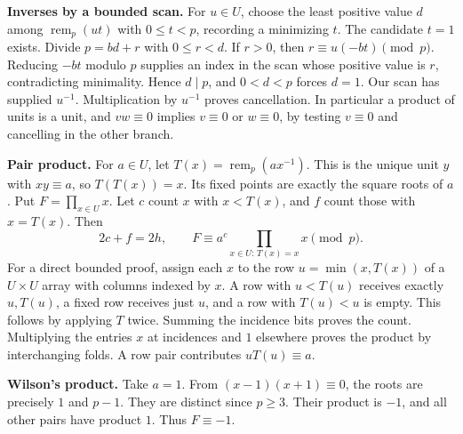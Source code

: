 \documentclass[12pt,letterpaper]{article}
\newcommand{\lab}[1]{\textbf{#1.}\enspace}
\newcommand{\remn}{\operatorname{rem}}
\begin{document}
\lab{Inverses by a bounded scan} For $u\in U$, choose the least positive value $d$ among $\remn_p(ut)$ with $0\le t<p$, recording a minimizing $t$. The candidate $t=1$ exists. Divide $p=bd+r$ with $0\le r<d$. If $r>0$, then $r\equiv u(-bt)\pmod p$. Reducing $-bt$ modulo $p$ supplies an index in the scan whose positive value is $r$, contradicting minimality. Hence $d\mid p$, and $0<d<p$ forces $d=1$. Our scan has supplied $u^{-1}$. Multiplication by $u^{-1}$ proves cancellation. In particular a product of units is a unit, and $vw\equiv0$ implies $v\equiv0$ or $w\equiv0$, by testing $v\equiv0$ and cancelling in the other branch.

\lab{Pair product} For $a\in U$, let $T(x)=\remn_p(ax^{-1})$. This is the unique unit $y$ with $xy\equiv a$, so $T(T(x))=x$. Its fixed points are exactly the square roots of $a$. Put $F=\prod_{x\in U}x$. Let $c$ count $x$ with $x<T(x)$, and $f$ count those with $x=T(x)$. Then
\begin{equation}\label{eq:pair}
  2c+f=2h,\qquad F\equiv a^c\!\!\prod_{x\in U:\,T(x)=x}x\pmod p.
\end{equation}
For a direct bounded proof, assign each $x$ to the row $u=\min(x,T(x))$ of a $U\times U$ array with columns indexed by $x$. A row with $u<T(u)$ receives exactly $u,T(u)$, a fixed row receives just $u$, and a row with $T(u)<u$ is empty. This follows by applying $T$ twice. Summing the incidence bits proves the count. Multiplying the entries $x$ at incidences and $1$ elsewhere proves the product by interchanging folds. A row pair contributes $uT(u)\equiv a$.

\lab{Wilson's product} Take $a=1$. From $(x-1)(x+1)\equiv0$, the roots are precisely $1$ and $p-1$. They are distinct since $p\ge3$. Their product is $-1$, and all other pairs have product $1$. Thus $F\equiv-1$.
\end{document}
